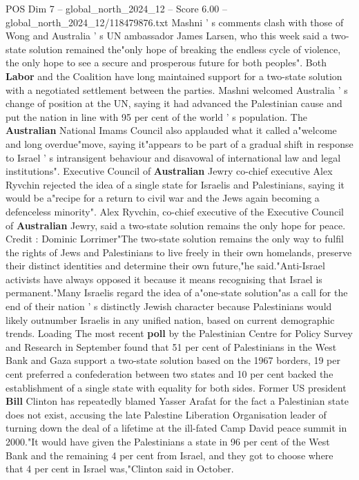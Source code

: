 \begin{textsample}{POS Dim 7 – global\_north\_2024\_12 – Score 6.00 – global\_north\_2024\_12/118479876.txt}
Mashni ' s comments clash with those of Wong and Australia ' s UN ambassador James Larsen, who this week said a two-state solution remained the"only hope of breaking the endless cycle of violence, the only hope to see a secure and prosperous future for both peoples".
Both \textbf{Labor} and the Coalition have long maintained support for a two-state solution with a negotiated settlement between the parties.
Mashni welcomed Australia ' s change of position at the UN, saying it had advanced the Palestinian cause and put the nation in line with 95 per cent of the world ' s population.
The \textbf{Australian} National Imams Council also applauded what it called a"welcome and long overdue"move, saying it"appears to be part of a gradual shift in response to Israel ' s intransigent behaviour and disavowal of international law and legal institutions".
Executive Council of \textbf{Australian} Jewry co-chief executive Alex Ryvchin rejected the idea of a single state for Israelis and Palestinians, saying it would be a"recipe for a return to civil war and the Jews again becoming a defenceless minority".
Alex Ryvchin, co-chief executive of the Executive Council of \textbf{Australian} Jewry, said a two-state solution remains the only hope for peace.
Credit : Dominic Lorrimer"The two-state solution remains the only way to fulfil the rights of Jews and Palestinians to live freely in their own homelands, preserve their distinct identities and determine their own future,"he said."Anti-Israel activists have always opposed it because it means recognising that Israel is permanent."Many Israelis regard the idea of a"one-state solution"as a call for the end of their nation ' s distinctly Jewish character because Palestinians would likely outnumber Israelis in any unified nation, based on current demographic trends.
Loading The most recent \textbf{poll} by the Palestinian Centre for Policy Survey and Research in September found that 51 per cent of Palestinians in the West Bank and Gaza support a two-state solution based on the 1967 borders, 19 per cent preferred a confederation between two states and 10 per cent backed the establishment of a single state with equality for both sides.
Former US president \textbf{Bill} Clinton has repeatedly blamed Yasser Arafat for the fact a Palestinian state does not exist, accusing the late Palestine Liberation Organisation leader of turning down the deal of a lifetime at the ill-fated Camp David peace summit in 2000."It would have given the Palestinians a state in 96 per cent of the West Bank and the remaining 4 per cent from Israel, and they got to choose where that 4 per cent in Israel was,"Clinton said in October.

\end{textsample}
